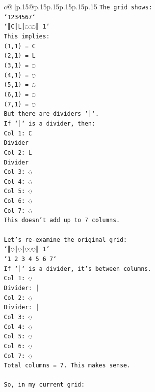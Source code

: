 \documentclass{article}
\begin{document}
{\begin{supertabular}{c@{$\;$}|p{.15\linewidth}@{}p{.15\linewidth}p{.15\linewidth}p{.15\linewidth}p{.15\linewidth}p{.15\linewidth}}
{{{\texttt{The grid shows:} \\
\texttt{`1234567`} \\
\texttt{`║C│L│◌◌◌║ 1`} \\
\texttt{This implies:} \\
\texttt{(1,1) = C} \\
\texttt{(2,1) = L} \\
\texttt{(3,1) = ◌} \\
\texttt{(4,1) = ◌} \\
\texttt{(5,1) = ◌} \\
\texttt{(6,1) = ◌} \\
\texttt{(7,1) = ◌} \\
\texttt{But there are dividers `│`.} \\
\texttt{If `│` is a divider, then:} \\
\texttt{Col 1: C} \\
\texttt{Divider} \\
\texttt{Col 2: L} \\
\texttt{Divider} \\
\texttt{Col 3: ◌} \\
\texttt{Col 4: ◌} \\
\texttt{Col 5: ◌} \\
\texttt{Col 6: ◌} \\
\texttt{Col 7: ◌} \\
\texttt{This doesn't add up to 7 columns.} \\
\\ 
\texttt{Let's re{-}examine the original grid:} \\
\texttt{`║◌│◌│◌◌◌║ 1`} \\
\texttt{`1 2 3 4 5 6 7`} \\
\texttt{If `│` is a divider, it's between columns.} \\
\texttt{Col 1: ◌} \\
\texttt{Divider: │} \\
\texttt{Col 2: ◌} \\
\texttt{Divider: │} \\
\texttt{Col 3: ◌} \\
\texttt{Col 4: ◌} \\
\texttt{Col 5: ◌} \\
\texttt{Col 6: ◌} \\
\texttt{Col 7: ◌} \\
\texttt{Total columns = 7. This makes sense.} \\
\\ 
\texttt{So, in my current grid:} \\
}}}
\end{supertabular}}
\end{document}

